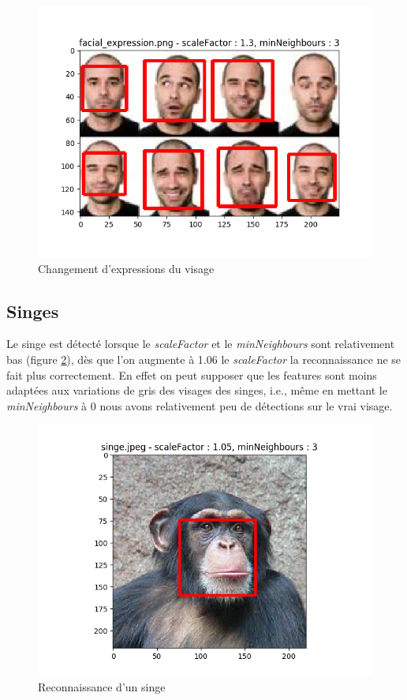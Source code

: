 \documentclass[a4paper,11pt]{article}
\begin{document}
	\begin{figure}[H]
	    \begin{center}
		\includegraphics[scale = 0.6]{images/facial_expression_1,3_3.png}
		\caption{Changement d'expressions du visage}
		\label{fig:visage_exp}
	    \end{center}
	\end{figure}

    
    \subsection{Singes}

	Le singe est détecté lorsque le	\textit{scaleFactor} et le \textit{minNeighbours} sont
	relativement bas (figure \ref{fig:singe}), dès que l'on augmente à 1.06 le
	\textit{scaleFactor} la reconnaissance ne se fait plus correctement.
	En effet on peut supposer que les features sont moins
	adaptées aux variations de gris des visages des singes, i.e., même en mettant le
	\textit{minNeighbours} à 0 nous avons relativement peu de détections sur le vrai visage.

	\begin{figure}[H]
	    \begin{center}
		\includegraphics[scale = 0.6]{images/singe_1,05_3.png}
		\caption{Reconnaissance d'un singe}
		\label{fig:singe}
	    \end{center}
	\end{figure}
\end{document}
